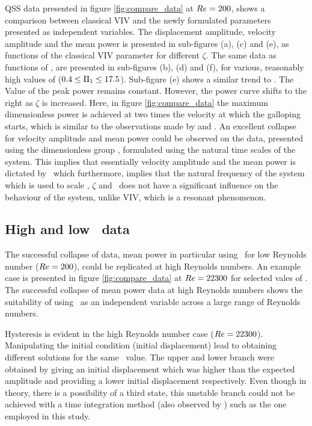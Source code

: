 QSS data presented in figure \ref{fig:compare_data} at $Re=200$, shows a comparison between classical VIV and the newly formulated parameters presented as independent variables. The displacement amplitude, velocity amplitude and the mean power is presented in sub-figures (a), (c) and (e), as functions of the classical VIV parameter \ustar for different $\zeta$. The same data as functions of \massdamp, are presented in sub-figures (b), (d) and (f), for various, reasonably high values of \massstiff ($0.4\leq\Pi_1\leq17.5$). Sub-figure (e) shows a similar trend to \cite{Barrero-Gil2010a}. The Value of the peak power remains constant. However, the power curve shifts to the right as $\zeta$ is increased. Here, in figure \ref{fig:compare_data} the maximum dimensionless power is achieved at two times the velocity at which the galloping starts, which is similar to the observations made by \citet{Barrero-Gil2010a} and \citet{vicente-Ludlam2014}. An excellent collapse for velocity amplitude and mean power could be observed on the data, presented using the dimensionless group \massdamp, formulated using the natural time scales of the system. This implies that essentially velocity amplitude and the mean power is dictated by \massdamp\ which furthermore, implies that the natural frequency of the system which is used to scale \ustar, $\zeta$ and \massstiff\ does not have a significant influence on the behaviour of the system, unlike VIV, which is a resonant phenomenon.  
 

\subsection{High and low \reynoldsnumber \ data}
\label{subsec:high_Re_data}



The successful collapse of data, mean power in particular using \massdamp\ for low Reynolds number ($Re=200$), could be replicated at high Reynolds numbers. An example case is presented in figure \ref{fig:compare_data} at $Re=22300$ for selected vales of \massstiff. The successful collapse of mean power data at high Reynolds numbers shows the suitability of using \massdamp \ as an independent variable across a large range of Reynolds numbers. 

Hysteresis is evident in the high Reynolds number case ($Re=22300$). Manipulating the initial condition (initial displacement) lead to obtaining different solutions for the same \massdamp \ value. The upper and lower branch were obtained by giving an initial displacement which was higher than the expected amplitude and providing a lower initial displacement respectively. Even though in theory, there is a possibility of a third state, this unstable branch could not be achieved with a time integration method (also observed by \citep{Vio2007}) such as the one employed in this study.

